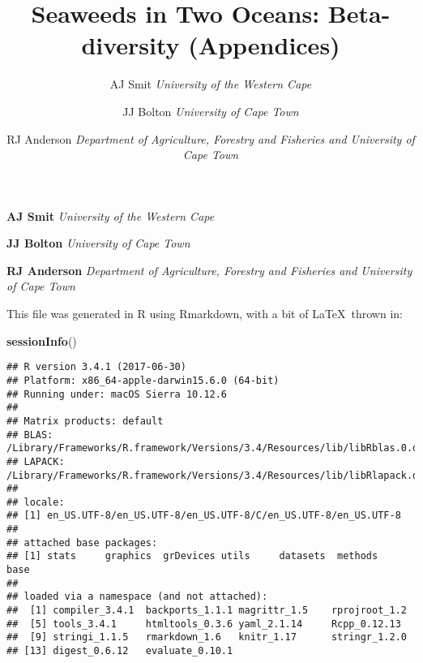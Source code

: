 \documentclass[10pt,A4,]{article}
\title{Seaweeds in Two Oceans: Beta-diversity (Appendices)  }
\author{\Large AJ Smit\vspace{0.05in} \newline\normalsize\emph{University of the Western Cape}   \and \Large JJ Bolton\vspace{0.05in} \newline\normalsize\emph{University of Cape Town}   \and \Large RJ Anderson\vspace{0.05in} \newline\normalsize\emph{Department of Agriculture, Forestry and Fisheries and University of Cape
Town}  }
\date{}
\newcommand*{\authorfont}{\fontfamily{phv}\selectfont}
\newenvironment{Shaded}{\begin{snugshade}}{\end{snugshade}}
\newcommand{\KeywordTok}[1]{\textcolor[rgb]{0.13,0.29,0.53}{\textbf{#1}}}
\newcommand{\NormalTok}[1]{#1}
\begin{document}

{%
\setlength{\parindent}{0pt}
\thispagestyle{plain}
{\fontsize{18}{20}\selectfont\raggedright
\maketitle  %
}
{
   \vskip 13.5pt\relax \normalsize\fontsize{11}{12}
\textbf{\authorfont AJ Smit} \hskip 15pt \emph{\small University of the Western Cape}   \par \textbf{\authorfont JJ Bolton} \hskip 15pt \emph{\small University of Cape Town}   \par \textbf{\authorfont RJ Anderson} \hskip 15pt \emph{\small Department of Agriculture, Forestry and Fisheries and University of Cape
Town}   
}
}



\vskip 6.5pt

\noindent 

This file was generated in R using Rmarkdown, with a bit of
\LaTeX~thrown in:

\begin{Shaded}
\begin{Highlighting}[]
\KeywordTok{sessionInfo}\NormalTok{()}
\end{Highlighting}
\end{Shaded}

\begin{verbatim}
## R version 3.4.1 (2017-06-30)
## Platform: x86_64-apple-darwin15.6.0 (64-bit)
## Running under: macOS Sierra 10.12.6
## 
## Matrix products: default
## BLAS: /Library/Frameworks/R.framework/Versions/3.4/Resources/lib/libRblas.0.dylib
## LAPACK: /Library/Frameworks/R.framework/Versions/3.4/Resources/lib/libRlapack.dylib
## 
## locale:
## [1] en_US.UTF-8/en_US.UTF-8/en_US.UTF-8/C/en_US.UTF-8/en_US.UTF-8
## 
## attached base packages:
## [1] stats     graphics  grDevices utils     datasets  methods   base     
## 
## loaded via a namespace (and not attached):
##  [1] compiler_3.4.1  backports_1.1.1 magrittr_1.5    rprojroot_1.2  
##  [5] tools_3.4.1     htmltools_0.3.6 yaml_2.1.14     Rcpp_0.12.13   
##  [9] stringi_1.1.5   rmarkdown_1.6   knitr_1.17      stringr_1.2.0  
## [13] digest_0.6.12   evaluate_0.10.1
\end{verbatim}
\end{document}
